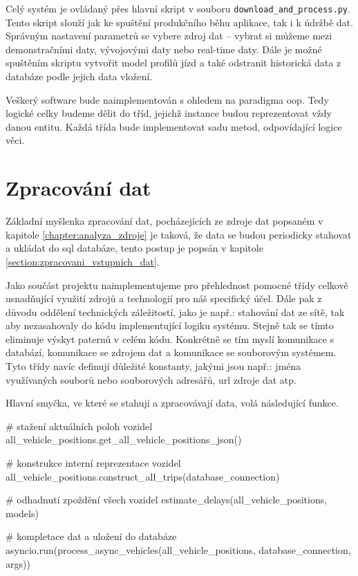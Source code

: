 \bigbreak


Celý systém je ovládaný přes hlavní skript v souboru \verb-download_and_process.py-. Tento skript slouží jak ke spuštění produkčního běhu aplikace, tak i k údržbě dat. Správným nastavení parametrů se vybere zdroj dat – vybrat si můžeme mezi demonstračními daty, vývojovými daty nebo real-time daty. Dále je možné spuštěním skriptu vytvořit model profilů jízd a také odstranit historická data z databáze podle jejich data vložení.


\bigbreak


Veškerý software bude naimplementován s ohledem na paradigma \gls{oop}. Tedy logické celky budeme dělit do tříd, jejichž instance budou reprezentovat vždy danou entitu. Každá třída bude implementovat sadu metod, odpovídající logice věci.


\section{Zpracování dat} \label{section:zpracovani_dat}


Základní myšlenka zpracování dat, pocházejících ze zdroje dat popsaném v kapitole \ref{chapter:analyza_zdroje} je taková, že data se budou periodicky stahovat a ukládat do \gls{sql} databáze, tento postup je popsán v kapitole \ref{section:zpracovani_vstupnich_dat}.


\bigbreak


Jako součást projektu naimplementujeme pro přehlednost pomocné třídy celkově usnadňující využití zdrojů a technologií pro náš specifický účel. Dále pak z důvodu oddělení technických záležitostí, jako je např.: stahování dat ze sítě, tak aby nezasahovaly do kódu implementující logiku systému. Stejně tak se tímto eliminuje výskyt paternů v celém kódu. Konkrétně se tím myslí komunikace s databází, komunikace se zdrojem dat a komunikace se souborovým systémem. Tyto třídy navíc definují důležité konstanty, jakými jsou např.: jména využívaných souborů nebo souborových adresářů, \gls{url} zdroje dat atp.


\bigbreak


Hlavní smyčka, ve které se stahují a zpracovávají data, volá následující funkce.


\begin{code}[frame=none]
# stažení aktuálních poloh vozidel
all_vehicle_positions.get_all_vehicle_positions_json()


# konstrukce interní reprezentace vozidel
all_vehicle_positions.construct_all_trips(database_connection)


# odhadnutí zpoždění všech vozidel
estimate_delays(all_vehicle_positions, models)


# kompletace dat a uložení do databáze
asyncio.run(process_async_vehicles(all_vehicle_positions, database_connection, args))
\end{code}


